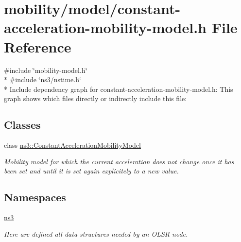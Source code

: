 \hypertarget{constant-acceleration-mobility-model_8h}{}\section{mobility/model/constant-\/acceleration-\/mobility-\/model.h File Reference}
\label{constant-acceleration-mobility-model_8h}
{\ttfamily \#include \char`\"{}mobility-\/model.\+h\char`\"{}}\\*
{\ttfamily \#include \char`\"{}ns3/nstime.\+h\char`\"{}}\\*
Include dependency graph for constant-\/acceleration-\/mobility-\/model.h\+:
This graph shows which files directly or indirectly include this file\+:
\subsection*{Classes}
\begin{DoxyCompactItemize}
\item 
class \hyperlink{classns3_1_1ConstantAccelerationMobilityModel}{ns3\+::\+Constant\+Acceleration\+Mobility\+Model}
\begin{DoxyCompactList}\small\item\em Mobility model for which the current acceleration does not change once it has been set and until it is set again explicitely to a new value. \end{DoxyCompactList}\end{DoxyCompactItemize}
\subsection*{Namespaces}
\begin{DoxyCompactItemize}
\item 
 \hyperlink{namespacens3}{ns3}
\begin{DoxyCompactList}\small\item\em Here are defined all data structures needed by an O\+L\+SR node. \end{DoxyCompactList}\end{DoxyCompactItemize}

